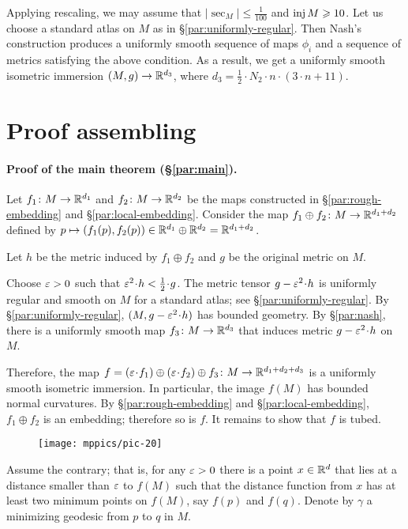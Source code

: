 \arxiv{\documentclass[a4paper,10pt]{article}}{\documentclass{mjm}}
\begin{document}
Applying rescaling, we may assume that $|\sec_M|\le \tfrac1{100}$ and $\operatorname{\rm inj} M\geqslant 10$.
Let us choose a standard atlas on $M$ as in §\ref{par:uniformly-regular}.
Then Nash's construction produces a uniformly smooth sequence of maps $\phi_i$ and a sequence of metrics satisfying the above condition.
As a result, we get a uniformly smooth isometric immersion $(M,g)\to \mathbb{R}^{d_3}$, where $d_3= \tfrac12\cdot N_2\cdot n\cdot(3\cdot n+11)$.

\section*{Proof assembling}


\paragraph{Proof of the main theorem (§\ref{par:main}).}\label{par:main-proof}
Let $f_1\colon M\to\mathbb{R}^{d_1}$ and $f_2\colon M\to\mathbb{R}^{d_2}$ be the maps constructed in §\ref{par:rough-embedding} and §\ref{par:local-embedding}.
Consider the map $f_1\oplus f_2\:M\z\to \RR^{d_1+d_2}$ defined by $p\mapsto (f_1(p),f_2(p))\in \mathbb{R}^{d_1}\oplus\mathbb{R}^{d_2}=\mathbb{R}^{d_1+d_2}$.

Let $h$ be the metric induced by $f_1\oplus f_2$
and $g$ be the original metric on $M$.

Choose $\varepsilon>0$ such that $\eps^2\cdot h<\tfrac12\cdot g$.
The metric tensor $g-\eps^2\cdot h$ is uniformly regular and smooth on $M$ for a standard atlas; see §\ref{par:uniformly-regular}.
By §\ref{par:uniformly-regular}, $(M,g-\eps^2\cdot h)$ has bounded geometry.
By §\ref{par:nash}, there is a uniformly smooth map $f_3\colon M\to\mathbb{R}^{d_3}$ that induces metric $g-\eps^2\cdot h$ on $M$.

Therefore, the map $f=(\eps\cdot f_1)\oplus (\eps\cdot f_2)\oplus f_3\:M\to \RR^{d_1+d_2+d_3}$ is a uniformly smooth isometric immersion.
In particular, the image $f(M)$ has bounded normal curvatures.
By §\ref{par:rough-embedding} and §\ref{par:local-embedding}, $f_1\oplus f_2$ is an embedding;
therefore so is $f$.
It remains to show that $f$ is tubed.


\begin{wrapfigure}{o}{45 mm}
\vskip-0mm
\centering
\texttt{[image: mppics/pic-20]}
\end{wrapfigure}

Assume the contrary;
that is, for any $\varepsilon>0$ there is a point $x\in \mathbb{R}^d$ that lies at a  distance smaller than $\varepsilon$ to $f(M)$ such that the distance function from $x$ has at least two minimum points on $f(M)$,
say $f(p)$ and $f(q)$.
Denote by $\gamma$ a minimizing geodesic from $p$ to $q$ in $M$.
\end{document}
